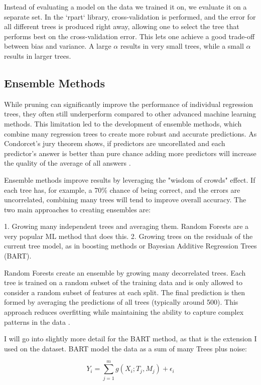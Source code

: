 \documentclass[12pt]{article}
\begin{document}
Instead of evaluating a model on the data we trained it on, we evaluate it on a separate set. In the `rpart` library, cross-validation is performed, and the error for all different trees is produced right away, allowing one to select the tree that performs best on the cross-validation error. This lets one achieve a good trade-off between bias and variance. A large $\alpha$ results in very small trees, while a small $\alpha$ results in larger trees.


\subsection{Ensemble Methods}
While pruning can significantly improve the performance of individual regression trees, they often still underperform compared to other advanced machine learning methods. This limitation led to the development of ensemble methods, which combine many regression trees to create more robust and accurate predictions. As Condorcet's jury theorem shows, if predictors are uncorellated and each predictor's answer is better than pure chance adding more predictors will increase the quality of the average of all answers \citep{condorcet1785}.

Ensemble methods improve results by leveraging the "wisdom of crowds" effect. If each tree has, for example, a 70\% chance of being correct, and the errors are uncorrelated, combining many trees will tend to improve overall accuracy. The two main approaches to creating ensembles are:

1. Growing many independent trees and averaging them. Random Forests are a very popular ML method that does this.
2. Growing trees on the residuals of the current tree model, as in boosting methods or Bayesian Additive Regression Trees (BART).

Random Forests create an ensemble by growing many decorrelated trees. Each tree is trained on a random subset of the training data and is only allowed to consider a random subset of features at each split. The final prediction is then formed by averaging the predictions of all trees (typically around 500). This approach reduces overfitting while maintaining the ability to capture complex patterns in the data \citep{biau2016}.

I will go into slightly more detail for the BART method, as that is the extension I used on the dataset. BART model the data as a sum of many Trees plus noise:

\begin{equation}
    Y_i = \sum_{j=1}^{m} g(X_i; T_j, M_j) + \epsilon_i
\end{equation}
\end{document}
